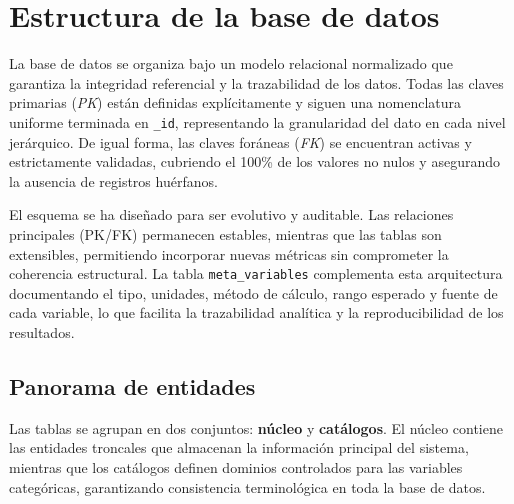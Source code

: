 \section{Estructura de la base de datos}


La base de datos se organiza bajo un modelo relacional normalizado que garantiza la integridad referencial y la trazabilidad de los datos. Todas las claves primarias (\textit{PK}) están definidas explícitamente y siguen una nomenclatura uniforme terminada en \texttt{\_id}, representando la granularidad del dato en cada nivel jerárquico. De igual forma, las claves foráneas (\textit{FK}) se encuentran activas y estrictamente validadas, cubriendo el 100\% de los valores no nulos y asegurando la ausencia de registros huérfanos.

El esquema se ha diseñado para ser evolutivo y auditable. Las relaciones principales (PK/FK) permanecen estables, mientras que las tablas son extensibles, permitiendo incorporar nuevas métricas sin comprometer la coherencia estructural. La tabla \texttt{meta\_variables} complementa esta arquitectura documentando el tipo, unidades, método de cálculo, rango esperado y fuente de cada variable, lo que facilita la trazabilidad analítica y la reproducibilidad de los resultados.

\subsection*{Panorama de entidades}

Las tablas se agrupan en dos conjuntos: \textbf{núcleo} y \textbf{catálogos}.  
El núcleo contiene las entidades troncales que almacenan la información principal del sistema, mientras que los catálogos definen dominios controlados para las variables categóricas, garantizando consistencia terminológica en toda la base de datos.

